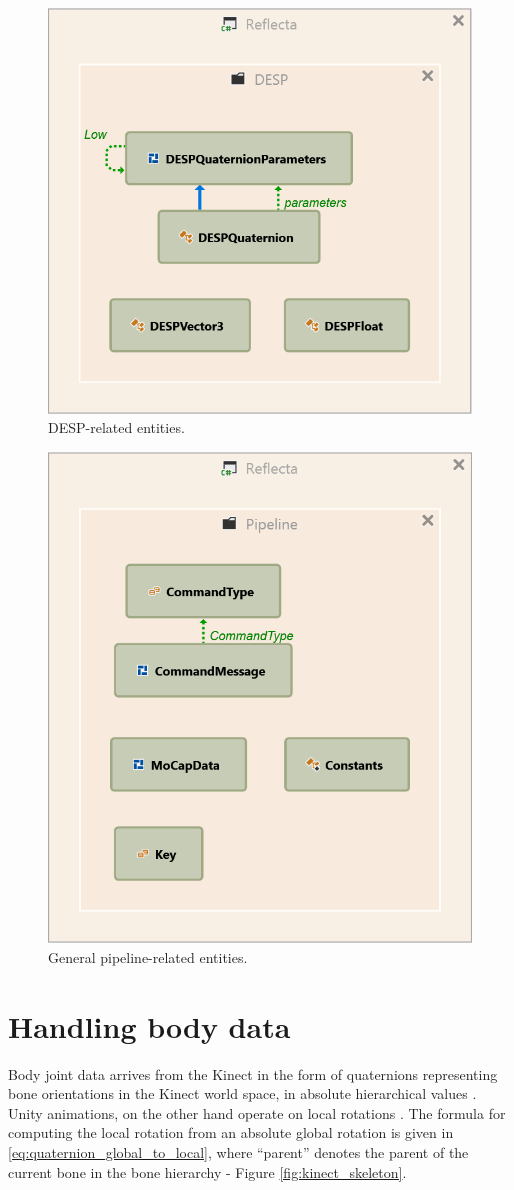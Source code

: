 \documentclass[a4paper, 12pt]{amsart}
\begin{document}
\begin{figure}[htb]
\centering
\includegraphics[width=.6\linewidth]{fig_reflecta_entity_relationships_desp}
\caption{DESP-related entities.}
\label{fig:reflecta_entity_relationships_desp}
\end{figure}

\begin{figure}[htb]
\centering
\includegraphics[width=.6\linewidth]{fig_reflecta_entity_relationships_pipeline}
\caption{General pipeline-related entities.}
\label{fig:reflecta_entity_relationships_pipeline}
\end{figure}

\clearpage

\section{Handling body data}
Body joint data arrives from the Kinect in the form of quaternions representing bone orientations in the Kinect world space, in absolute hierarchical values \cite{bib_microsoft_kinect_v2_sdk}. Unity animations, on the other hand operate on local rotations \cite{bib_unity}. The formula for computing the local rotation from an absolute global rotation \cite{bib_quaternions} is given in \eqref{eq:quaternion_global_to_local}, where ``parent'' denotes the parent of the current bone in the bone hierarchy - Figure \ref{fig:kinect_skeleton}.
\end{document}
